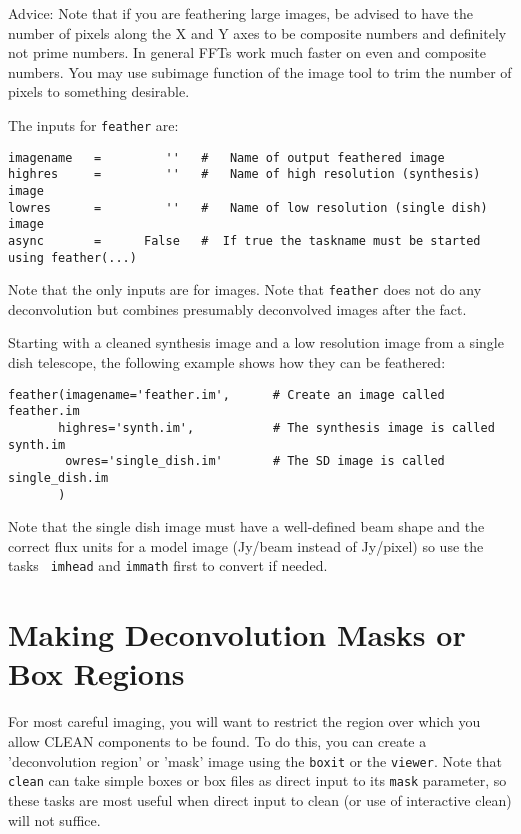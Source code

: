 Advice: Note that if you are feathering large images, be advised to
have the number of pixels along the X and Y axes to be composite
numbers and definitely not prime numbers. In general FFTs work much
faster on even and composite numbers. You may use subimage function of
the image tool to trim the number of pixels to something desirable.

The inputs for {\tt feather} are:
\small
\begin{verbatim}
imagename   =         ''   #   Name of output feathered image
highres     =         ''   #   Name of high resolution (synthesis) image
lowres      =         ''   #   Name of low resolution (single dish) image
async       =      False   #  If true the taskname must be started using feather(...)
\end{verbatim}
\normalsize
Note that the only inputs are for images.
Note that {\tt feather} does not do any deconvolution but combines presumably
deconvolved images after the fact.

Starting with a cleaned synthesis image and a low resolution image
from a single dish telescope, the following example shows how they
can be feathered:
\small
\begin{verbatim}
feather(imagename='feather.im',      # Create an image called feather.im
       highres='synth.im',           # The synthesis image is called synth.im
        owres='single_dish.im'       # The SD image is called single_dish.im
       )
\end{verbatim}
\normalsize

Note that the single dish image must have a
well-defined beam shape and the correct flux units for a model image
(Jy/beam instead of Jy/pixel) so use the tasks {\tt
imhead} and {\tt immath} first to convert if needed.

\section{Making Deconvolution Masks or Box Regions}
\label{section:im.mask}

For most careful imaging, you will want to restrict the region over
which you allow CLEAN components to be found.  To do this, you can
create a 'deconvolution region' or 'mask' image using the {\tt boxit}
or the {\tt viewer}.
Note that {\tt clean} can take simple boxes
or box files as direct input to its {\tt mask} parameter, so these
tasks are most useful when direct input to clean (or use of
interactive clean) will not suffice.

